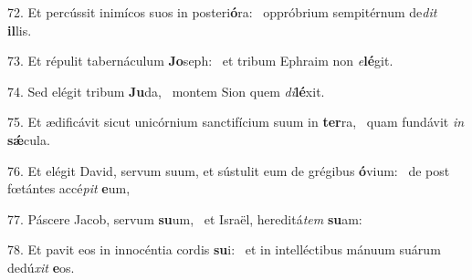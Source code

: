 72. Et percússit inimícos suos in posteri\textbf{ó}ra: \ast\  oppróbrium sempitérnum de\textit{dit} \textbf{il}lis.\

73. Et répulit tabernáculum \textbf{Jo}seph: \ast\  et tribum Ephraim non \textit{e}\textbf{lé}git.\

74. Sed elégit tribum \textbf{Ju}da, \ast\  montem Sion quem \textit{di}\textbf{lé}xit.\

75. Et ædificávit sicut unicórnium sanctifícium suum in \textbf{ter}ra, \ast\  quam fundávit \textit{in} \textbf{sǽ}cula.\

76. Et elégit David, servum suum, et sústulit eum de grégibus \textbf{ó}vium: \ast\  de post fœtántes accé\textit{pit} \textbf{e}um,\

77. Páscere Jacob, servum \textbf{su}um, \ast\  et Israël, hereditá\textit{tem} \textbf{su}am:\

78. Et pavit eos in innocéntia cordis \textbf{su}i: \ast\  et in intelléctibus mánuum suárum dedú\textit{xit} \textbf{e}os.\

